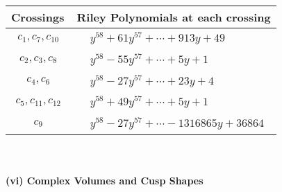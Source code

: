 \documentclass[1p]{elsarticle_modified}
\theoremstyle{definition}
\begin{document}
\begin{tabular}{m{50pt}|m{274pt}}
Crossings & \hspace{64pt}Riley Polynomials at each crossing \\
\hline $$\begin{aligned}c_{1},c_{7},c_{10}\end{aligned}$$&$\begin{aligned}
&y^{58}+61 y^{57}+\cdots+913 y+49
\end{aligned}$\\
\hline $$\begin{aligned}c_{2},c_{3},c_{8}\end{aligned}$$&$\begin{aligned}
&y^{58}-55 y^{57}+\cdots+5 y+1
\end{aligned}$\\
\hline $$\begin{aligned}c_{4},c_{6}\end{aligned}$$&$\begin{aligned}
&y^{58}-27 y^{57}+\cdots+23 y+4
\end{aligned}$\\
\hline $$\begin{aligned}c_{5},c_{11},c_{12}\end{aligned}$$&$\begin{aligned}
&y^{58}+49 y^{57}+\cdots+5 y+1
\end{aligned}$\\
\hline $$\begin{aligned}c_{9}\end{aligned}$$&$\begin{aligned}
&y^{58}-27 y^{57}+\cdots-1316865 y+36864
\end{aligned}$\\
\hline
\end{tabular}\\~\\
\newpage\flushleft \textbf{(vi) Complex Volumes and Cusp Shapes}
\end{document}
